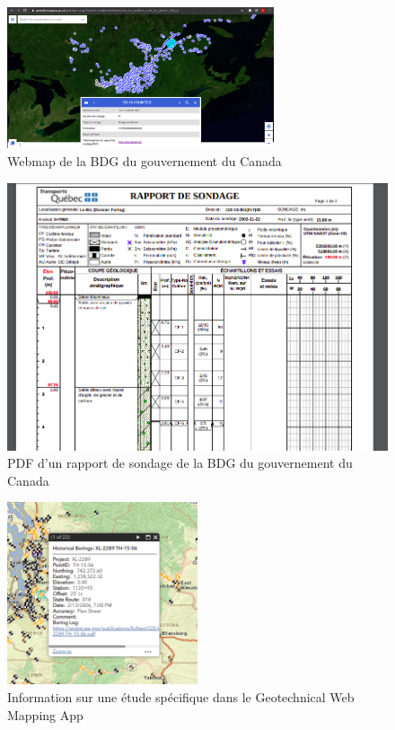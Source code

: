 \begin{figure}[t]
    \centering
    \includegraphics[width=0.7\textwidth]{images/Contexte/bdg.png}
    \caption{Webmap de la BDG du gouvernement du Canada \cite{canadagov}}
    \label{fig:BDG}
\end{figure}
\begin{figure}[t]
    \centering
    \includegraphics[width=1\textwidth]{images/Contexte/pdf_bdg.png}
    \caption{PDF d'un rapport de sondage de la BDG du gouvernement du Canada \cite{linkpdfcanada}}
    \label{fig:PDF_BDG}
\end{figure}
\begin{figure}[t]
    \centering
    \includegraphics[width=0.5\textwidth]{images/Contexte/wash.png}
    \caption{Information sur une étude spécifique dans le Geotechnical Web Mapping App \cite{map1}}
    \label{fig:wash}
\end{figure}

